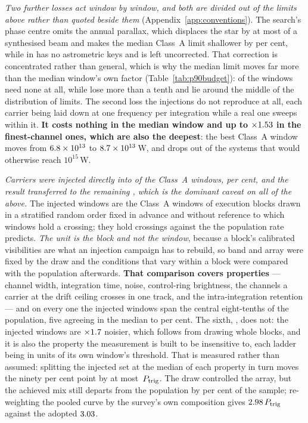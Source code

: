 \emph{Two further losses act window by window, and both are divided out of
the limits above rather than quoted beside them}
(Appendix~\ref{app:conventions}). The search's phase centre omits the annual
parallax, which displaces the star by at most \SensBeamsMax{} of a synthesised
beam and makes the median Class~A limit shallower by \PxaShiftWinPct{} per
cent, while \PxaMissingStar{} in \PxaMissingEb{} has no astrometric keys and
is left uncorrected. That correction is concentrated rather than general,
which is why the median limit moves far more than the median window's own
factor (Table~\ref{tab:p90budget}): \RpPxNNone{} of the \NWinA{} windows need
none at all, while \RpPxNBig{} lose more than a tenth and lie around the
middle of the distribution of limits. The second
loss the injections do not reproduce at all, each carrier being laid down at
one frequency per integration while a real one sweeps within it.
\textbf{It costs nothing in the median window and up to $\times1.53$
in the \SmcNAbove{} finest-channel ones, which are also the deepest}: the best
Class~A window moves from $6.8\times10^{13}$ to $8.7\times10^{13}$\,W, and
\SmcLostStars{} drops out of the \SmcSysEfifteenWas{} systems that would
otherwise reach $10^{15}$\,W.

\emph{Carriers were injected directly into \SensNInj{} of the \NWinA{}
Class~A windows, \SensNInjPct{} per cent, and the result transferred to the
remaining \SensNTransfer, which is the dominant caveat on all of the above.}
The injected windows are the Class~A windows of execution blocks drawn in a
stratified random order fixed in advance and without reference to which
windows hold a crossing; they hold \SensNCrossAch{} crossings against the
\SensNCrossExp{} the population rate predicts. \emph{The unit is the block and
not the window}, because a block's calibrated visibilities are what an
injection campaign has to rebuild, so band and array were fixed by the draw
and the conditions that vary within a block were compared with the population
afterwards. \textbf{That comparison covers \RpNAxis{} properties} --- channel
width, integration time, noise, control-ring brightness, the channels a
carrier at the drift ceiling crosses in one track, and the intra-integration
retention --- and on every one the injected windows span the central
eight-tenths of the population, five agreeing in the median to
\RpCovOtherPct{} per cent. The sixth, \RpCovWorstAxis, does not: the injected
windows are $\times1.7$ noisier, which follows from drawing whole
blocks, and it is also the property the measurement is built to be
insensitive to, each ladder being in units of its own window's threshold.
That is measured rather than assumed: splitting the injected set at the median
of each property in turn moves the ninety per cent point by at most
\RpFacShiftMax\,$P_{\rm trig}$. The draw controlled the array, but the
achieved mix still departs from the population by \SensCovWorstPct{} per cent
of the sample; re-weighting the pooled curve by the survey's own composition
gives
$2.98\,P_{\rm trig}$ against the adopted
$3.03$.

